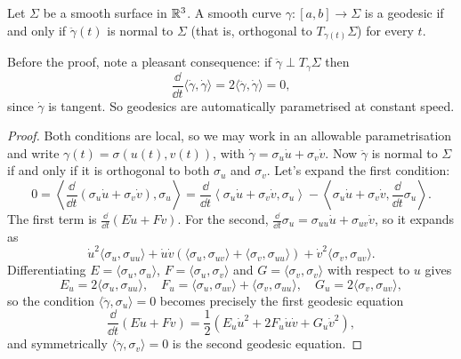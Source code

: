 \documentclass[a4paper]{scrartcl}
\begin{document}
\begin{proposition}\label{prop:geodesicnormal}
    Let $\Sigma$ be a smooth surface in $\mathbb{R}^3$. A smooth curve $\gamma : [a, b] \rightarrow \Sigma$ is a geodesic if and only if $\ddot{\gamma}(t)$ is normal to $\Sigma$ (that is, orthogonal to $T_{\gamma(t)}\Sigma$) for every $t$.
\end{proposition}

\begin{remark}
    Before the proof, note a pleasant consequence: if $\ddot\gamma \perp T_\gamma \Sigma$ then
    $$
    \frac{\dd}{\dd t}\langle \dot\gamma, \dot\gamma \rangle = 2 \langle \ddot \gamma, \dot\gamma \rangle = 0,
    $$
    since $\dot\gamma$ is tangent. So geodesics are automatically parametrised at constant speed.
\end{remark}
\begin{proof}
    Both conditions are local, so we may work in an allowable parametrisation and write $\gamma(t) = \sigma(u(t), v(t))$, with $\dot\gamma = \sigma_u \dot u + \sigma_v \dot v$. Now $\ddot\gamma$ is normal to $\Sigma$ if and only if it is orthogonal to both $\sigma_u$ and $\sigma_v$. Let's expand the first condition:
    $$
    0 = \left\langle \frac{\dd}{\dd t}\left(\sigma_u \dot u + \sigma_v \dot v\right), \sigma_u \right\rangle = \frac{\dd}{\dd t}\left\langle \sigma_u \dot u + \sigma_v \dot v, \sigma_u \right\rangle - \left\langle \sigma_u \dot u + \sigma_v \dot v, \frac{\dd}{\dd t}\sigma_u \right\rangle.
    $$
    The first term is $\frac{\dd}{\dd t}(E \dot u + F \dot v)$. For the second, $\frac{\dd}{\dd t}\sigma_u = \sigma_{uu}\dot u + \sigma_{uv} \dot v$, so it expands as
    $$
    \dot u^2 \langle \sigma_u, \sigma_{uu}\rangle + \dot u \dot v \left(\langle \sigma_u, \sigma_{uv}\rangle + \langle \sigma_v, \sigma_{uu} \rangle\right) + \dot v^2 \langle \sigma_v, \sigma_{uv} \rangle.
    $$
    Differentiating $E = \langle \sigma_u, \sigma_u\rangle$, $F = \langle \sigma_u, \sigma_v \rangle$ and $G = \langle \sigma_v, \sigma_v\rangle$ with respect to $u$ gives
    $$
    E_u = 2\langle \sigma_u, \sigma_{uu}\rangle, \quad F_u = \langle \sigma_u, \sigma_{uv}\rangle + \langle \sigma_v, \sigma_{uu} \rangle, \quad G_u = 2 \langle \sigma_v, \sigma_{uv}\rangle,
    $$
    so the condition $\langle \ddot\gamma, \sigma_u \rangle = 0$ becomes precisely the first geodesic equation
    $$
    \frac{\dd}{\dd t}(E \dot u + F \dot v) = \frac{1}{2}\left(E_u \dot u^2 + 2F_u \dot u \dot v + G_u \dot v^2\right),
    $$
    and symmetrically $\langle \ddot \gamma, \sigma_v \rangle = 0$ is the second geodesic equation.
\end{proof}
\end{document}

